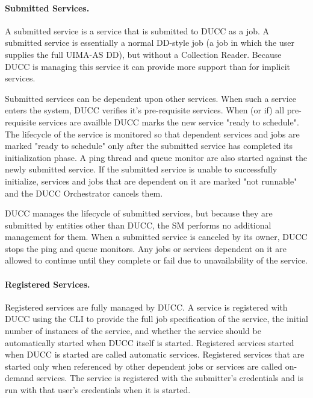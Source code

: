       \paragraph{Submitted Services.} A submitted service is a service that is submitted to DUCC as a job. A
      submitted service is essentially a normal DD-style job (a job in which the user supplies the
      full UIMA-AS DD), but without a Collection Reader. Because DUCC is managing this service it can
      provide more support than for implicit services.
      
      Submitted services can be dependent upon other services. When such a service enters the system,
      DUCC verifies it's pre-requisite services. When (or if) all pre-requisite services are availble
      DUCC marks the new service "ready to schedule". The lifecycle of the service is monitored so
      that dependent services and jobs are marked "ready to schedule" only after the submitted service
      has completed its initialization phase. A ping thread and queue monitor are also started against
      the newly submitted service. If the submitted service is unable to successfully initialize,
      services and jobs that are dependent on it are marked "not runnable" and the DUCC Orchestrator
      cancels them.
      
      DUCC manages the lifecycle of submitted services, but because they are submitted by entities
      other than DUCC, the SM performs no additional management for them. When a submitted service is
      canceled by its owner, DUCC stops the ping and queue monitors. Any jobs or services dependent on
      it are allowed to continue until they complete or fail due to unavailability of the service.
      
      \paragraph{Registered Services.} Registered services are fully managed by DUCC. A service is
      registered with DUCC using the CLI to provide the full job specification of the service, the
      initial number of instances of the service, and whether the service should be automatically
      started when DUCC itself is started. Registered services started when DUCC is started are
      called automatic services.  Registered services that are started only when referenced by other
      dependent jobs or services are called on-demand services. The service is registered with the
      submitter's credentials and is run with that user's credentials when it is started.

